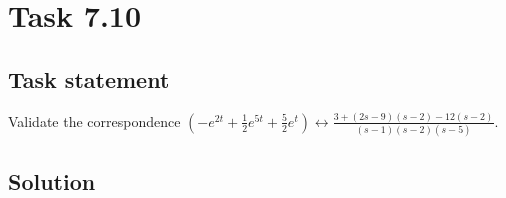 \section*{Task 7.10}

\subsection*{Task statement}

Validate the correspondence $(-e^{2t} + \frac{1}{2} e^{5t} + \frac{5}{2} e^t) \leftrightarrow \frac{3 + (2s - 9)(s - 2) - 12(s - 2)}{(s - 1)(s - 2)(s - 5)}$.

\subsection*{Solution}

